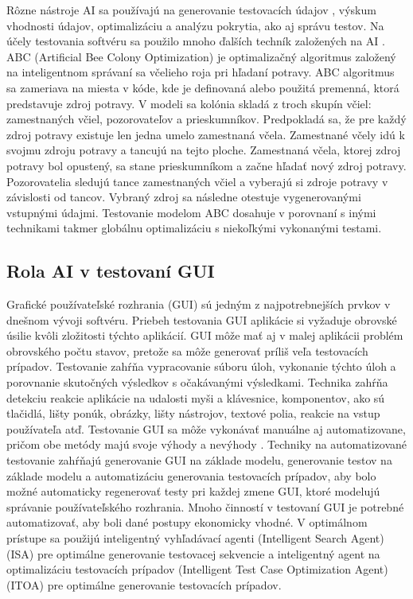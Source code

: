 \documentclass[10pt,twoside,slovak,a4paper]{article}
\begin{document}
Rôzne nástroje AI sa používajú na generovanie testovacích údajov , výskum vhodnosti údajov, optimalizáciu a analýzu pokrytia, ako aj správu testov. Na účely testovania softvéru sa použilo mnoho ďalších techník založených na AI \cite{6926420}.
ABC (Artificial Bee Colony Optimization) \cite{7542311} je optimalizačný algoritmus založený na inteligentnom správaní sa včelieho roja pri hľadaní potravy. ABC algoritmus sa zameriava na miesta v kóde, kde je definovaná alebo použitá premenná, ktorá predstavuje zdroj potravy. V modeli sa kolónia skladá z troch skupín včiel: zamestnaných včiel, pozorovateľov a prieskumníkov. Predpokladá sa, že pre každý zdroj potravy existuje len jedna umelo zamestnaná včela. Zamestnané včely idú k svojmu zdroju potravy a tancujú na tejto ploche. Zamestnaná včela, ktorej zdroj potravy bol opustený, sa stane prieskumníkom a začne hľadať nový zdroj potravy. Pozorovatelia sledujú tance zamestnaných včiel a vyberajú si zdroje potravy v závislosti od tancov. Vybraný zdroj sa následne otestuje vygenerovanými vstupnými údajmi. Testovanie modelom ABC dosahuje v porovnaní s inými technikami takmer globálnu optimalizáciu s niekoľkými vykonanými testami.

\subsection{Rola AI v testovaní GUI} \label{rola ai v gui}

Grafické používateľské rozhrania (GUI) sú jedným z najpotrebnejších prvkov v dnešnom vývoji softvéru. Priebeh testovania GUI aplikácie si vyžaduje obrovské úsilie kvôli zložitosti týchto aplikácií. GUI môže mať aj v malej aplikácii problém obrovského počtu stavov, pretože sa môže generovať príliš veľa testovacích prípadov. Testovanie zahŕňa vypracovanie súboru úloh, vykonanie týchto úloh a porovnanie skutočných výsledkov s očakávanými výsledkami. Technika zahŕňa detekciu reakcie aplikácie na udalosti myši a klávesnice, komponentov, ako sú tlačidlá, lišty ponúk, obrázky, lišty nástrojov, textové polia, reakcie na vstup používateľa atď. Testovanie GUI sa môže vykonávať manuálne aj automatizovane, pričom obe metódy majú svoje výhody a nevýhody \cite{6926420}. Techniky na automatizované testovanie zahŕňajú generovanie GUI na základe modelu, generovanie testov na základe modelu a automatizáciu generovania testovacích prípadov, aby bolo možné automaticky regenerovať testy pri každej zmene GUI, ktoré modelujú správanie používateľského rozhrania. Mnoho činností v testovaní GUI je potrebné automatizovať, aby boli dané postupy ekonomicky vhodné. V optimálnom prístupe sa použijú inteligentný vyhľadávací agenti (Intelligent Search Agent) (ISA) pre optimálne generovanie testovacej sekvencie a inteligentný agent na optimalizáciu testovacích prípadov (Intelligent Test Case Optimization Agent) (ITOA) pre optimálne generovanie testovacích prípadov.\cite{6926420}
\end{document}
